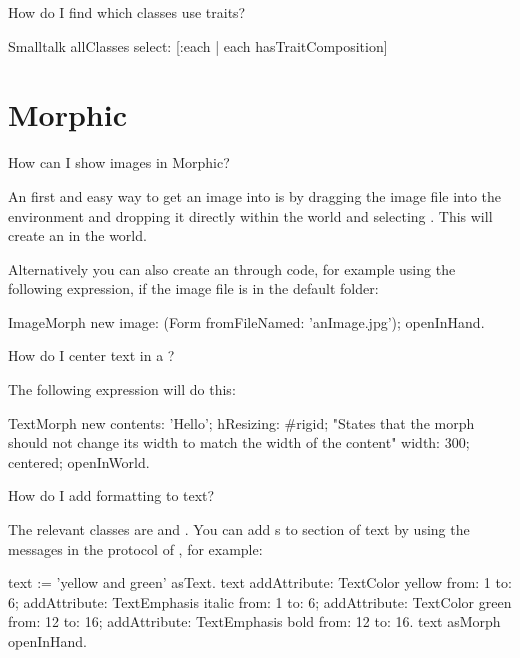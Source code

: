 \documentclass[a4paper,10pt,twoside]{book}
\begin{document}
\begin{faq}
How do I find which classes use traits?
\end{faq}
\answer
\begin{code}{}
Smalltalk allClasses select: [:each | each hasTraitComposition]
\end{code}

\section{Morphic}
\begin{faq}
How can I show images in Morphic?
\end{faq}
\answer
An first and easy way to get an image into \sq is by dragging the image file into the environment and dropping it directly within the world and selecting .
This will create an  in the world.

\noindent Alternatively you can also create an  through code, for example using the following expression, if the image file is in the default folder:
\begin{code}{}
ImageMorph new
    image: (Form fromFileNamed: 'anImage.jpg');
    openInHand.
\end{code}  

\begin{faq}
How do I center text in a ?
\end{faq}
\answer
The following expression will do this:
\begin{code}{}
TextMorph new
    contents: 'Hello';
    hResizing: #rigid; "States that the morph should not change 
                        its width to match the width of the content"
    width: 300;
    centered;
    openInWorld.
\end{code}  

\begin{faq}
How do I add formatting to text?
\end{faq}
\answer
The relevant classes are  and . 
You can add s to section of text by using the messages in the  protocol of , for example:
\begin{code}{}
text := 'yellow and green' asText.
text 
	addAttribute: TextColor yellow from: 1 to: 6;
	addAttribute: TextEmphasis italic from: 1 to: 6;
	addAttribute: TextColor green from: 12 to: 16;
	addAttribute: TextEmphasis bold from: 12 to: 16.
text asMorph openInHand.
\end{code}  
\end{document}
